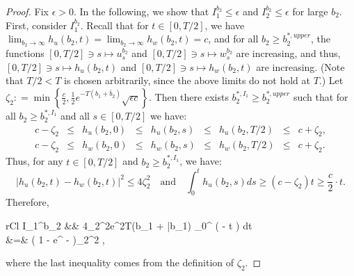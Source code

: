 \documentclass[11pt]{article}
\begin{document}
\begin{proof}
	Fix $\epsilon>0$. In the following, we show that $I_1^{b_2} \leq \epsilon$ and $I_2^{b_2} \leq \epsilon$ for large $b_2$. First, consider $I_1^{b_2}$. Recall that for $t \in[0,T/2]$, we have $\lim_{b_2 \to \infty}h_u(b_2,t) = \lim_{b_2 \to \infty}h_w(b_2,t) = c$, and for all $b_2 \geq b_2^{*,upper}$, the functions $[0,T/2] \ni s \mapsto u_s^{b_2}$ and $[0,T/2] \ni s \mapsto w_s^{b_2}$ are increasing, and thus, $[0,T/2] \ni s \mapsto h_u(b_2,t)$ and $[0,T/2] \ni s \mapsto h_w(b_2,t)$ are increasing. (Note that $T/2<T$ is chosen arbitrarily, since the above limits do not hold at $T$.) Let
	$ \zeta_2: = \min \left\{ \frac{c}{2},  \frac{1}{2} e^{-T(b_1+\bar{b}_2)} \sqrt{\epsilon c} \right\}.$
	Then there exists $b_2^{*,I_1}  \geq b_2^{*,upper}$ such that for all $b_2 \geq b_2^{*,I_1}$ and all $s\in [0, T/2]$ we have:
	\begin{equation*}
	\begin{array}{lclclclcl}
		c - \zeta_2 &\leq& h_u(b_2,0) &\leq& h_u(b_2,s) &\leq& h_u(b_2, T/2 ) &\leq& c + \zeta_2, \\
		c - \zeta_2 &\leq& h_w(b_2,0) &\leq& h_w(b_2,s) &\leq& h_w(b_2, T/2 ) &\leq& c + \zeta_2.
	\end{array}
	\end{equation*}
	Thus, for any $t \in [0,T/2]$ and $b_2 \geq b_2^{*,I_1}$, we have:
	$$
		\left\vert h_u(b_2, t) - h_w(b_2,t) \right\vert^2 \leq  4 \zeta_2^2 \quad \text{and} \quad \int_0^t h_u(b_2,s)ds \geq (c - \zeta_2) t \geq \frac{c}{2}\cdot t.
	$$
	Therefore,
	\begin{IEEEeqnarray}{rCl}
		I_1^{b_2} &\leq& 4\zeta_2^2e^{2T(b_1 + \bar{b}_1)} \cdot{} \int_0^{} \exp \left(  -  \cdot {}\cdot t \right) dt \nonumber \\
		&=&  \left( 1 - e^{ -    } \right)\zeta_2^2 \leq \epsilon, 
	\label{eq:I1_ineq_b2_infinity}
	\end{IEEEeqnarray}
	where the last inequality comes from the definition of $\zeta_2$.
	

\end{proof}
\end{document}
